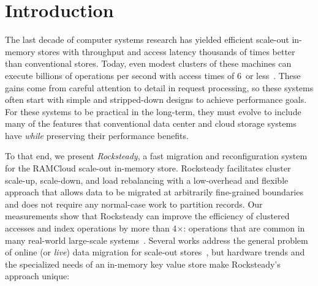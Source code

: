 \section{Introduction}
\label{ref:intro}

The last decade of computer systems research has yielded efficient scale-out
in-memory stores with throughput and access latency thousands of times better
than conventional stores. Today, even modest clusters of these machines can
execute billions of operations per second with access times of 6~\us or
less~\cite{ramcloud,farm-2014}.  These gains come from careful attention to detail
in request processing, so these systems often start with simple
and stripped-down designs to achieve performance goals. For these
systems to be practical in the long-term, they must evolve to include many of the
features that conventional data center and cloud storage systems have
{\em while} preserving their performance benefits.

To that end, we present {\em Rocksteady}, a fast migration and reconfiguration
system for the RAMCloud scale-out in-memory store.  Rocksteady
facilitates cluster
scale-up, scale-down, and load rebalancing with a low-overhead and flexible
approach that allows data to be migrated at arbitrarily fine-grained boundaries and does not
require any normal-case work to partition records.  Our measurements show that
Rocksteady can improve the efficiency of clustered accesses and index
operations by more than 4$\times$: operations that are common in many
real-world large-scale systems~\cite{fb-memcache,spanner}.  Several works
address the general problem of online (or {\em live}) data migration for
scale-out stores~\cite{slacker,estore,squall,albatross,zephyr,dynamo,spanner},
but hardware trends and the specialized needs of an in-memory key value store
make Rocksteady's approach unique:

